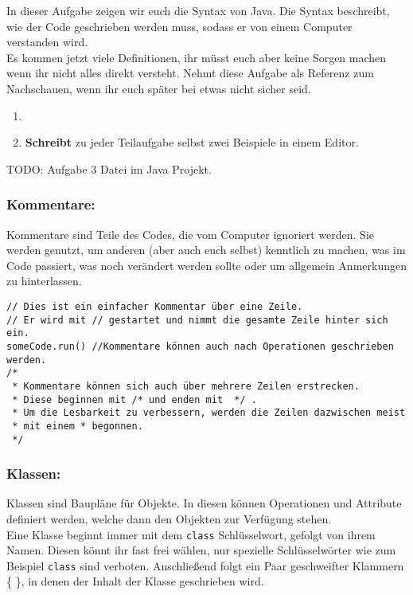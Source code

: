 
\noindent
In dieser Aufgabe zeigen wir euch die Syntax von Java.
Die Syntax beschreibt, wie der Code geschrieben werden muss, sodass er von einem Computer verstanden wird.\\
Es kommen jetzt viele Definitionen, ihr müsst euch aber keine Sorgen machen wenn ihr nicht alles direkt versteht.
Nehmt diese Aufgabe als Referenz zum Nachschauen, wenn ihr euch später bei etwas nicht sicher seid.
\begin{enumerate}
    \item {}
    \item \textbf{Schreibt} zu jeder Teilaufgabe selbst zwei Beispiele in einem Editor. 
\end{enumerate}


{\color{red}TODO: Aufgabe 3 Datei im Java Projekt.}


\subsubsection*{Kommentare:}
Kommentare sind Teile des Codes, die vom Computer ignoriert werden.
Sie werden genutzt, um anderen (aber auch euch selbst) kenntlich zu machen, was im Code passiert, was noch verändert werden sollte oder um allgemein Anmerkungen zu hinterlassen.

\begin{lstlisting}[title=\textbf{Kommentar Beispiel}]
// Dies ist ein einfacher Kommentar über eine Zeile.
// Er wird mit // gestartet und nimmt die gesamte Zeile hinter sich ein.
someCode.run() //Kommentare können auch nach Operationen geschrieben werden.
/*
 * Kommentare können sich auch über mehrere Zeilen erstrecken.
 * Diese beginnen mit /* und enden mit  */ . 
 * Um die Lesbarkeit zu verbessern, werden die Zeilen dazwischen meist 
 * mit einem * begonnen.
 */
\end{lstlisting}
\lstset{
	basicstyle=\small
}
\subsubsection*{Klassen:}
Klassen sind Baupläne für Objekte. In diesen können Operationen und Attribute definiert werden, welche dann den Objekten zur Verfügung stehen.\\
Eine Klasse beginnt immer mit dem \lstinline{class} Schlüsselwort, gefolgt von ihrem Namen. Diesen könnt ihr fast frei wählen, nur spezielle Schlüsselwörter wie zum Beispiel \lstinline{class} sind verboten. Anschließend folgt ein Paar geschweifter Klammern \{ \}, in denen der Inhalt der Klasse geschrieben wird.


